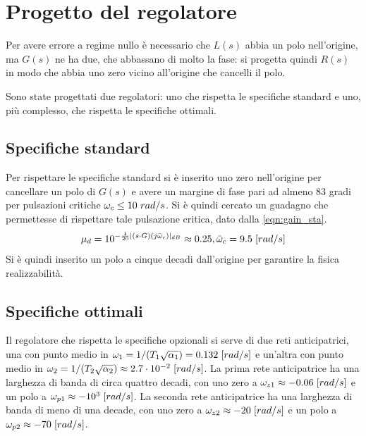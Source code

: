 \documentclass[a4paper]{article}
\begin{document}
\section{Progetto del regolatore}

Per avere errore a regime nullo è necessario che $L(s)$ abbia un polo nell'origine, ma $G(s)$ ne ha due, che abbassano di molto la fase: si progetta quindi $R(s)$ in modo che abbia uno zero vicino all'origine che cancelli il polo.

Sono state progettati due regolatori: uno che rispetta le specifiche standard e uno, più complesso, che rispetta le specifiche ottimali.

\subsection{Specifiche standard}
Per rispettare le specifiche standard si è inserito uno zero nell'origine per cancellare un polo di $G(s)$ e avere un margine di fase pari ad almeno 83 gradi per pulsazioni critiche $\omega_c \le 10\hspace{0.3em} rad/s$.
Si è quindi cercato un guadagno che permettesse di rispettare tale pulsazione critica, dato dalla \cref{eqn:gain_sta}.
\begin{equation}
\mu_d =  10^{-\frac{1}{20}|(s \cdot G)(j \bar{\omega}_c)|_{dB}} \approx 0.25, \bar{\omega}_c = 9.5 \hspace{0.3em} [rad/s]
\label{eqn:gain_sta}
\end{equation}
Si è quindi inserito un polo a cinque decadi dall'origine per garantire la fisica realizzabilità.

\subsection{Specifiche ottimali}
Il regolatore che rispetta le specifiche opzionali si serve di due reti anticipatrici, una con punto medio in $\omega_1 = 1/ (T_1 \sqrt{\alpha_1}) = 0.132 \hspace{0.3em} [rad/s]$ e un'altra con punto medio in $\omega_2 = 1/ (T_2 \sqrt{\alpha_2}) \approx 2.7 \cdot 10^{-2} \hspace{0.3em} [rad/s]$.
La prima rete anticipatrice ha una larghezza di banda di circa quattro decadi, con uno zero a $\omega_{z1} \approx -0.06 \hspace{0.3em} [rad/s]$ e un polo a $\omega_{p1} \approx -10^3 \hspace{0.3em} [rad/s]$. 
La seconda rete anticipatrice ha una larghezza di banda di meno di una decade, con uno zero a $\omega_{z2} \approx -20\hspace{0.3em} [rad/s]$ e un polo a $\omega_{p2} \approx -70\hspace{0.3em} [rad/s]$.
\end{document}
